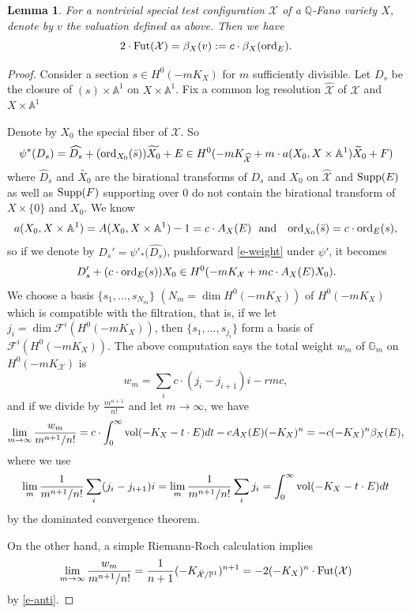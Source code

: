 \documentclass[12pt,reqno]{amsart}%
\newcommand{\cX}{{\mathcal{X}}}
\newcommand{\cF}{\mathcal{F}}
\newcommand{\ord}{{\rm ord}}
\newtheorem{lem}[thm]{Lemma}
\theoremstyle{definition}
\theoremstyle{remark}
\newcommand{\Fut}{{\rm Fut}}
\newcommand{\vol}{{\rm vol}}
\begin{document}
\begin{lem}\label{l-beta=w}
For a nontrivial special test configuration $\cX$ of a $\mathbb{Q}$-Fano variety $X$,  denote by $v$ the valuation defined as above. Then we have 
\[
2\cdot {\rm Fut}(\cX)= \beta_X(v):=c\cdot \beta_X(\ord_E).
\]
\end{lem}
\begin{proof}Consider a section $s\in H^0(-mK_X)$ for $m$ sufficiently divisible. Let $D_s$ be the closure of $(s)\times \mathbb{A}^1$ on $X\times \mathbb{A}^1$. Fix a common log resolution $\widehat{\cX}$ of $\cX$ and $X\times \mathbb{A}^1$ 
\begin{center}
    \end{center}
Denote by $X_0$ the special fiber of $\cX$.     So 
\begin{eqnarray}\label{e-weight}
\psi^*(D_s)=\widehat{D_s}+(\ord_{X_0}(\bar{s}))\widetilde{X_0}+E\in H^0(	-mK_{\widehat{\cX}}+m\cdot a(X_0,X\times \mathbb{A}^1)\widetilde{X}_0+F) 
\end{eqnarray} where $\widehat{D}_{s}$ and $\widetilde{X_0}$ are the birational transforms of $D_{s}$ and $X_0$ on $\widehat{\cX}$ and ${\rm Supp}(E)$ as well as ${\rm Supp}(F)$ supporting over $0$ do not contain the birational transform of $X\times\{0\}$ and $X_0$. We know 
$$a(X_0,X\times \mathbb{A}^1)=A(X_0,X\times \mathbb{A}^1)-1=c\cdot A_{X}(E ) \mbox{\ \ and \ \ }\ord_{X_0}(\bar{s})=c\cdot \ord_E(s),$$
so if we denote by $D_s'=\psi'_*\big(\widehat{D_s})$, pushforward \eqref{e-weight} under $\psi'$, it becomes 
$$D_s'+(c\cdot\ord_E(s))X_0\in H^0(-mK_{\cX}+mc\cdot A_X(E){X}_0).$$
 We choose  a basis $\{s_1,..., s_{N_m}\}$ $(N_m=\dim H^0(-mK_X))$ of $H^0(-mK_{X})$ which is compatible with the filtration, that is, if we let $j_i=\dim \cF^i(H^0(-mK_X))$, then 
$\{s_1,..., s_{j_i}\}$ form a basis of $\cF^i(H^0(-mK_X))$. The above computation says
the total weight $w_m$ of $\mathbb{G}_m$ on $H^0(-mK_{\cX})$ is
\[
 w_m=\sum_ic\cdot(j_{i}-j_{i+1})i-rmc,
\]
and if we divide by $\frac{m^{n+1}}{n!}$ and let $m\to \infty$, we have 
\[
\lim_{m\to \infty}\frac{w_m}{m^{n+1}/n!}=c\cdot \int^{\infty}_{0}\vol(-K_X-t\cdot E)dt-cA_X(E)(-K_X)^n=-c(-K_X)^n\beta_X(E),
\]
where we use
\[
\lim_m \frac{1}{m^{n+1} /n!}\sum_i(j_{i}-j_{i+1})i=\lim_m \frac{1}{m^{n+1} /n!}\sum_ij_i=\int^{\infty}_{0}\vol(-K_X-t\cdot E)dt 
\]
by the dominated convergence theorem. 

On the other hand, a simple Riemann-Roch calculation implies 
$$\lim_{m\to \infty}\frac{w_m}{m^{n+1}/n!}=\frac{1}{n+1}(-K_{\bar{\cX}/\mathbb{P}^1})^{n+1}=-2(-K_X)^n\cdot \Fut(\cX)$$ by \eqref{e-anti}.
 \end{proof}
\end{document}
